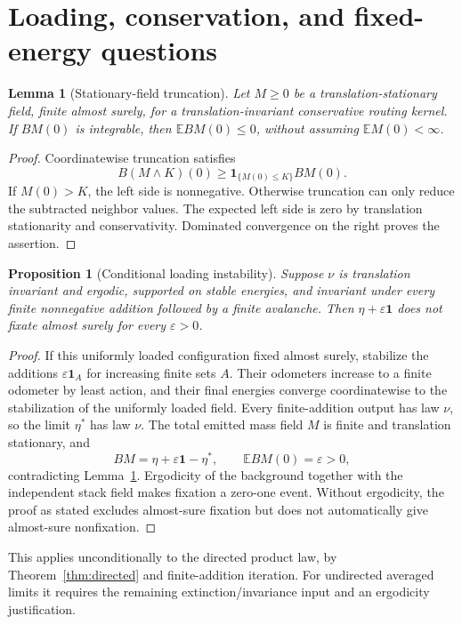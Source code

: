 \documentclass[11pt]{article}
\numberwithin{equation}{section}
\newtheorem{proposition}[theorem]{Proposition}
\newtheorem{lemma}[theorem]{Lemma}
\theoremstyle{definition}
\newcommand{\E}{\mathbb E}
\newcommand{\ind}{\mathbf 1}
\begin{document}
\section{Loading, conservation, and fixed-energy questions}\label{sec:loading}

\begin{lemma}[Stationary-field truncation]\label{lem:truncation}
Let $M\ge0$ be a translation-stationary field, finite almost surely, for a translation-invariant conservative routing kernel. If $BM(0)$ is integrable, then $\E BM(0)\le0$, without assuming $\E M(0)<\infty$.
\end{lemma}
\begin{proof}
Coordinatewise truncation satisfies
\[
 B(M\wedge K)(0)\ge\ind_{\{M(0)\le K\}}BM(0).
\]
If $M(0)>K$, the left side is nonnegative. Otherwise truncation can only reduce the subtracted neighbor values. The expected left side is zero by translation stationarity and conservativity. Dominated convergence on the right proves the assertion.
\end{proof}

\begin{proposition}[Conditional loading instability]\label{prop:loading}
Suppose $\nu$ is translation invariant and ergodic, supported on stable energies, and invariant under every finite nonnegative addition followed by a finite avalanche. Then $\eta+\varepsilon\ind$ does not fixate almost surely for every $\varepsilon>0$.
\end{proposition}
\begin{proof}
If this uniformly loaded configuration fixed almost surely, stabilize the additions $\varepsilon\ind_A$ for increasing finite sets $A$. Their odometers increase to a finite odometer by least action, and their final energies converge coordinatewise to the stabilization of the uniformly loaded field. Every finite-addition output has law $\nu$, so the limit $\eta^*$ has law $\nu$. The total emitted mass field $M$ is finite and translation stationary, and
\[
 BM=\eta+\varepsilon\ind-\eta^*,\qquad \E BM(0)=\varepsilon>0,
\]
contradicting Lemma~\ref{lem:truncation}. Ergodicity of the background together with the independent stack field makes fixation a zero-one event. Without ergodicity, the proof as stated excludes almost-sure fixation but does not automatically give almost-sure nonfixation.
\end{proof}
This applies unconditionally to the directed product law, by Theorem~\ref{thm:directed} and finite-addition iteration. For undirected averaged limits it requires the remaining extinction/invariance input and an ergodicity justification.
\end{document}
